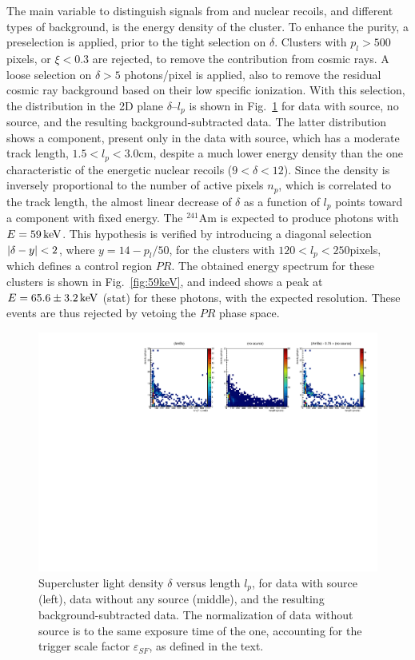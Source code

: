 The main variable to distinguish signals from and nuclear recoils, and
different types of background, is the energy density of the cluster.
To enhance the purity, a preselection is applied, prior to the tight
selection on $\delta$. Clusters with $p_l>500$ pixels, or $\xi<0.3$
are rejected, to remove the contribution from cosmic rays. A loose
selection on $\delta>5$ photons/pixel is applied, also to remove the
residual cosmic ray background based on their low specific ionization.
With this selection, the distribution in the 2D plane $\delta$--$l_p$
is shown in Fig.~\ref{fig:dvsl} for data with \ambe source, no source,
and the resulting background-subtracted \ambe data. The latter
distribution shows a component, present only in the data with \ambe
source, which has a moderate track length, $1.5<l_p<3.0$\unit{cm},
despite a much lower energy density than the one characteristic of the
energetic nuclear recoils ($9<\delta<12$). Since the density is
inversely proportional to the number of active pixels $n_p$, which is
correlated to the track length, the almost linear decrease of $\delta$
as a function of $l_p$ points toward a component with fixed
energy. The $^{241}$Am is expected to produce photons with
$E=59\,\textrm{ke\hspace{-.08em}V}$. This hypothesis is verified by introducing a diagonal
selection $\vert \delta-y \vert<2$, where $y=14-p_l/50$, for the clusters
with $120<l_p<250$\unit{pixels}, which defines a control region
$PR$. The obtained energy spectrum for these clusters is shown in
Fig.~\ref{fig:59keV}, and indeed shows a peak at $E=65.6\pm3.2\,\textrm{ke\hspace{-.08em}V}$
(stat) for these photons, with the expected resolution. These events
are thus rejected by vetoing the $PR$ phase space.

\begin{figure}[ht]
  \begin{center}
  \includegraphics[width=0.90\linewidth]{figures/densityvslength_zoom}

  \caption{Supercluster light density $\delta$ versus length $l_p$,
    for data with \ambe source (left), data without any source
    (middle), and the resulting background-subtracted \ambe data.  The
    normalization of data without source is to the same exposure time
    of the \ambe one, accounting for the trigger scale factor
    $\varepsilon_{SF}$, as defined in the text. \label{fig:dvsl}}

  \end{center}
\end{figure}

